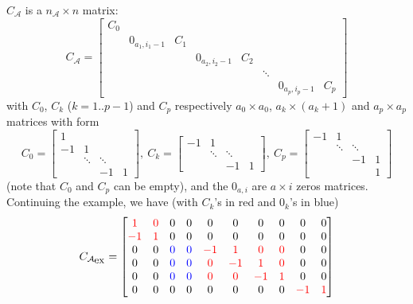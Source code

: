 \documentclass[]{article}
\newcommand{\BIN}{\begin{bmatrix}}
\newcommand{\BOUT}{\end{bmatrix}}
\newcommand{\cred}[1]{\textcolor{red}{#1}}
\newcommand{\cblue}[1]{\textcolor{blue}{#1}}
\begin{document}
$C_\mathcal{A}$ is a $n_{\mathcal{A}}\times n$ matrix:
\begin{equation}
  C_\mathcal{A} = 
  \BIN C_0 &     &     &     &     &        &     &    \\
           & 0_{a_1, i_1-1} & C_1 &     &     &        &     &    \\
           &     &     & 0_{a_2, i_2-1} & C_2 &        &     &    \\
           &     &     &     &     & \ddots &     &    \\
           &     &     &     &     &        & 0_{a_p, i_p-1} & C_p\BOUT
\end{equation}
with $C_0$, $C_k$ ($k=1..p-1$) and $C_p$ respectively $a_0\times a_0$, $a_k\times (a_k+1)$ and $a_p\times a_p$ matrices with form
\begin{equation}
  C_0 = \BIN 1 &        &        &   \\
            -1 &    1   &        &   \\
               & \ddots & \ddots &   \\
               &        &   -1   & 1 \BOUT, \
  C_k = \BIN-1 &    1   &        &   \\
               & \ddots & \ddots &   \\
               &        &   -1   & 1 \BOUT, \
  C_p = \BIN-1 &    1    &        &   \\
               & \ddots  & \ddots &   \\
               &         &   -1   & 1 \\
               &         &        & 1 \BOUT \nonumber
\end{equation}
(note that $C_0$ and $C_p$ can be empty), and the $0_{a,i}$ are $a\times i$ zeros matrices. Continuing the example, we have (with $C_k$'s in red and $0_k$'s in blue)
\begin{equation}
C_{\mathcal{A}_{\mbox{\small ex}}} = \BIN                                           
   \cred{1} & \cred{0} & 0 & 0 &  0 &  0 &  0 & 0 &  0 & 0 \\
  \cred{-1} & \cred{1} & 0 & 0 &  0 &  0 &  0 & 0 &  0 & 0 \\
   0 & 0 & \cblue{0} & \cblue{0} & \cred{-1} & \cred{1} & \cred{0} & \cred{0} &  0 & 0 \\
   0 & 0 & \cblue{0} & \cblue{0} & \cred{0} & \cred{-1} & \cred{1} & \cred{0} &  0 & 0 \\
   0 & 0 & \cblue{0} & \cblue{0} & \cred{0} & \cred{0} & \cred{-1} & \cred{1} &  0 & 0 \\
   0 & 0 & 0 & 0 &  0 &  0 &  0 & 0 & \cred{-1} & \cred{1} \\
\BOUT
\end{equation}
\end{document}
